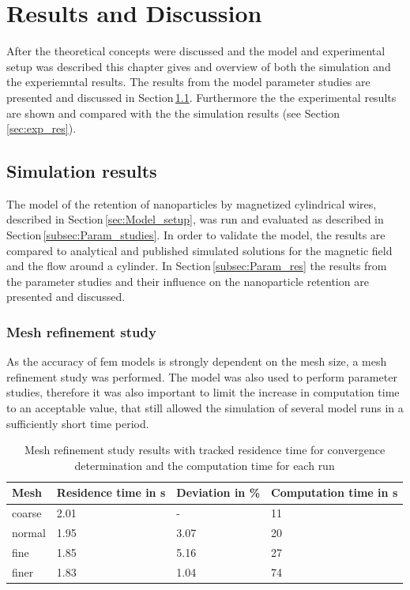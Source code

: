 

\chapter{Results and Discussion}
\label{chap:chap_res}
After the theoretical concepts were discussed and the model and experimental setup was described this chapter gives and overview of both the simulation and the experiemntal results. The results from the model parameter studies are presented and discussed in Section\,\ref{sec:sim_res}. Furthermore the the experimental results are shown and compared with the the simulation results (see Section\,\ref{sec:exp_res}). 

\section{Simulation results}
\label{sec:sim_res}
The model of the retention of nanoparticles by magnetized cylindrical wires, described in Section\,\ref{sec:Model_setup}, was run and evaluated as described in Section\,\ref{subsec:Param_studies}. In order to validate the model, the results are compared to analytical and published simulated solutions for the magnetic field and the flow around a cylinder. In Section\,\ref{subsec:Param_res} the results from the parameter studies and their influence on the nanoparticle retention are presented and discussed.  

\subsection{Mesh refinement study}
\label{subsec:mesh_ref}
\FloatBarrier
As the accuracy of \gls{fem} models is strongly dependent on the mesh size, a mesh refinement study was performed. The model was also used to perform parameter studies, therefore it was also important to limit the increase in computation time to an acceptable value, that still allowed the simulation of several model runs in a sufficiently short time period. 

\begin{table}
\centering
\caption[Mesh refinement study results]{Mesh refinement study results with tracked residence time for convergence determination and the computation time for each run}
\label{table:Mesh_Ref_res}
\begin{tabularx}{\textwidth}{XXXX}
\hline
Mesh & Residence time in s & Deviation in \% & Computation time in s\\
\hline\hline
coarse &  2.01 & -  & 11\\
normal & 1.95 & 3.07 & 20\\
fine &  1.85 & 5.16 & 27 \\
finer &  1.83 & 1.04 & 74\\
\hline
\end{tabularx}
\end{table}

